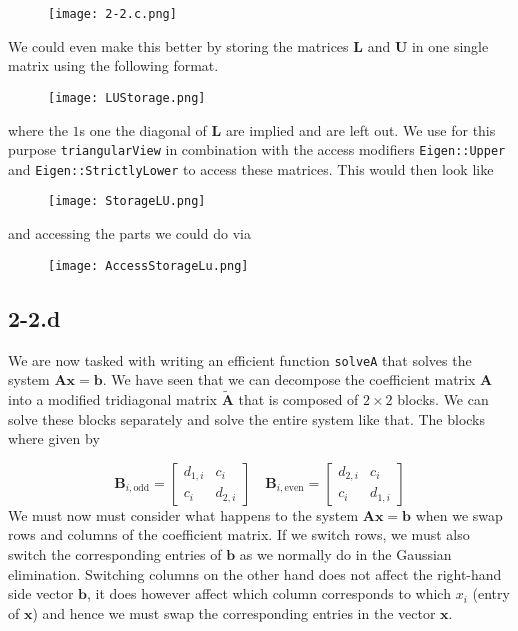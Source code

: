 \documentclass{article}
\begin{document}
\begin{figure}[!hbt]
    \centering
\texttt{[image: 2-2.c.png]}
\end{figure}

\pagebreak

\noindent We could even make this better by storing the matrices $\mathbf{L}$ and $\mathbf{U}$ in one single matrix using the following format.

\begin{figure}[!hbt]
    \centering
\texttt{[image: LUStorage.png]}
\end{figure}

\noindent where the $1$s one the diagonal of $\mathbf{L}$ are implied and are left out. We use for this purpose \verb|triangularView| in combination with the access modifiers \verb|Eigen::Upper| and \verb|Eigen::StrictlyLower| to access these matrices. This would then look like
\begin{figure}[!hbt]
    \centering
\texttt{[image: StorageLU.png]}
\end{figure}

\noindent and accessing the parts we could do via

\begin{figure}[!hbt]
    \centering
\texttt{[image: AccessStorageLu.png]}
\end{figure}

\subsection*{2-2.d}
We are now tasked with writing an efficient function \verb|solveA| that solves the system $\mathbf{A}\mathbf{x} = \mathbf{b}$. We have seen that we can decompose the coefficient matrix $\mathbf{A}$ into a modified tridiagonal matrix $\tilde{\mathbf{A}}$ that is composed of $2 \times 2$ blocks. We can solve these blocks separately and solve the entire system like that. The blocks where given by

\begin{equation*}
    \mathbf{B}_{i, \text{odd}} = \begin{bmatrix}
        d_{1, i} & c_{i} \\
        c_{i} & d_{2,i}
    \end{bmatrix} \quad
    \mathbf{B}_{i, \text{even}} = \begin{bmatrix}
        d_{2, i} & c_{i} \\
        c_{i} & d_{1,i}
    \end{bmatrix}
\end{equation*}
We must now must consider what happens to the system $\mathbf{A}\mathbf{x} = \mathbf{b}$ when we swap rows and columns of the coefficient matrix. If we switch rows, we must also switch the corresponding entries of $\mathbf{b}$ as we normally do in the Gaussian elimination. Switching columns on the other hand does not affect the right-hand side vector $\mathbf{b}$, it does however affect which column corresponds to which $x_{i}$ (entry of $\mathbf{x}$) and hence we must swap the corresponding entries in the vector $\mathbf{x}$.
\end{document}
